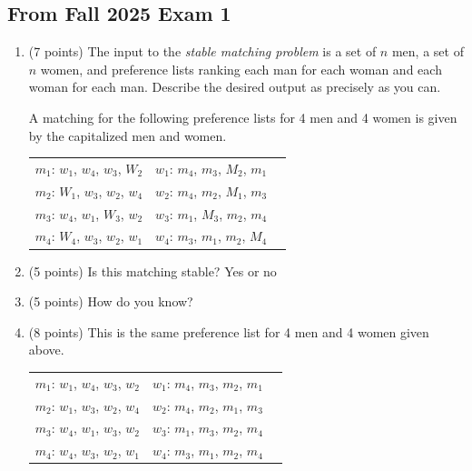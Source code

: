 \documentclass[11pt]{article}
\begin{document}
\subsection*{From Fall 2025 Exam 1}
\begin{enumerate}
\item (7 points) The input to the \emph{stable
matching problem} is a set of $n$ men, a set of $n$ women, and preference lists
ranking each man for each woman and each woman for each man. Describe the
desired output as precisely as you can.

\vspace{1in}

A matching for the following preference lists for 4 men and 4 women is given by
the capitalized men and women.

\begin{center}
\begin{tabular}{ c c c }
    $m_1$: $w_1$, $w_4$, $w_3$, $W_2$ &  $w_1$: $m_4$, $m_3$, $M_2$, $m_1$\\
    $m_2$: $W_1$, $w_3$, $w_2$, $w_4$ &  $w_2$: $m_4$, $m_2$, $M_1$, $m_3$\\
    $m_3$: $w_4$, $w_1$, $W_3$, $w_2$ &  $w_3$: $m_1$, $M_3$, $m_2$, $m_4$\\ 
    $m_4$: $W_4$, $w_3$, $w_2$, $w_1$ &  $w_4$: $m_3$, $m_1$, $m_2$, $M_4$
\end{tabular}
\end{center}

    
    \item (5 points) Is this matching stable? Yes or no

    \item (5 points) How do you know?

\vspace{1in}


\item (8 points)
This is the same preference list for 4 men and 4 women given above.

\begin{center}
\begin{tabular}{ c c c }
    $m_1$: $w_1$, $w_4$, $w_3$, $w_2$ &  $w_1$: $m_4$, $m_3$, $m_2$, $m_1$\\
    $m_2$: $w_1$, $w_3$, $w_2$, $w_4$ &  $w_2$: $m_4$, $m_2$, $m_1$, $m_3$\\
    $m_3$: $w_4$, $w_1$, $w_3$, $w_2$ &  $w_3$: $m_1$, $m_3$, $m_2$, $m_4$\\ 
    $m_4$: $w_4$, $w_3$, $w_2$, $w_1$ &  $w_4$: $m_3$, $m_1$, $m_2$, $m_4$
\end{tabular}
\end{center}


\end{enumerate}
\end{document}
